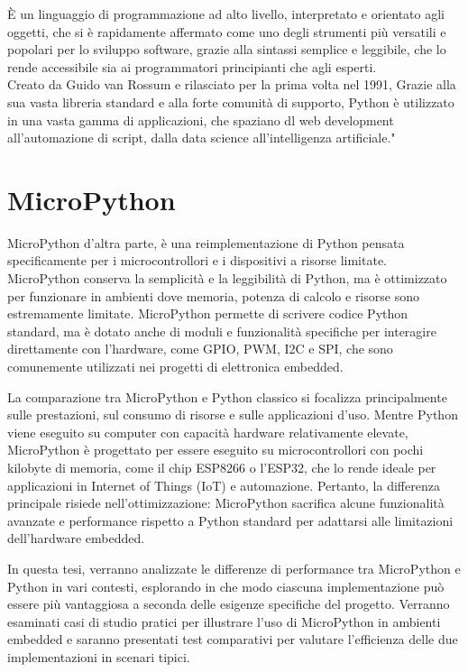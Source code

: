 \documentclass[12pt,a4paper]{report}
\begin{document}
È un linguaggio di programmazione ad alto livello, interpretato e
orientato agli oggetti, che si è rapidamente affermato come uno degli
strumenti più versatili e popolari per lo sviluppo software, grazie alla
sintassi semplice e leggibile, che lo rende accessibile sia ai
programmatori principianti che agli esperti.\\
Creato da Guido van Rossum e rilasciato per la prima volta nel 1991,
Grazie alla sua vasta libreria standard e alla forte comunità di
supporto, Python è utilizzato in una vasta gamma di applicazioni, che
spaziano dl web development all'automazione di script, dalla data science all'intelligenza artificiale."

\section{MicroPython}

MicroPython d'altra parte, è una reimplementazione di
Python pensata specificamente per i microcontrollori e i dispositivi a
risorse limitate. MicroPython conserva la semplicità e la leggibilità di
Python, ma è ottimizzato per funzionare in ambienti dove memoria,
potenza di calcolo e risorse sono estremamente limitate. MicroPython
permette di scrivere codice Python standard, ma è dotato anche di moduli
e funzionalità specifiche per interagire direttamente con
l'hardware, come GPIO, PWM, I2C e SPI, che sono
comunemente utilizzati nei progetti di elettronica embedded.

La comparazione tra MicroPython e Python classico si focalizza
principalmente sulle prestazioni, sul consumo di risorse e sulle
applicazioni d'uso. Mentre Python viene eseguito su
computer con capacità hardware relativamente elevate, MicroPython è
progettato per essere eseguito su microcontrollori con pochi kilobyte di
memoria, come il chip ESP8266 o l'ESP32, che lo rende
ideale per applicazioni in Internet of Things (IoT) e automazione.
Pertanto, la differenza principale risiede
nell'ottimizzazione: MicroPython sacrifica alcune
funzionalità avanzate e performance rispetto a Python standard per
adattarsi alle limitazioni dell'hardware embedded.

In questa tesi, verranno analizzate le differenze di performance tra
MicroPython e Python in vari contesti, esplorando in che modo ciascuna
implementazione può essere più vantaggiosa a seconda delle esigenze
specifiche del progetto. Verranno esaminati casi di studio pratici per
illustrare l'uso di MicroPython in ambienti embedded e
saranno presentati test comparativi per valutare
l'efficienza delle due implementazioni in scenari
tipici.
\end{document}
